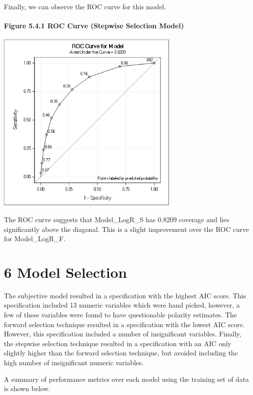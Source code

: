 \documentclass[]{article}
\let\oldparagraph\paragraph
\renewcommand{\paragraph}[1]{\oldparagraph{#1}\mbox{}}
\begin{document}
Finally, we can observe the ROC curve for this model.

\paragraph{Figure 5.4.1 ROC Curve (Stepwise Selection
Model)}\label{figure-5.4.1-roc-curve-stepwise-selection-model}

\includegraphics[height=3.54167in]{images/roc_s.png}

The ROC curve suggests that Model\_LogR\_S has 0.8209 coverage and lies
significantly above the diagonal. This is a slight improvement over the
ROC curve for Model\_LogR\_F.

\section{6 Model Selection}\label{model-selection}

The subjective model resulted in a specification with the highest AIC
score. This specification included 13 numeric variables which were hand
picked, however, a few of these variables were found to have
questionable polarity estimates. The forward selection technique
resulted in a specification with the lowest AIC score. However, this
specification included a number of insignificant variables. Finally, the
stepwise selection technique resulted in a specification with an AIC
only slightly higher than the forward selection technique, but avoided
including the high number of insignificant numeric variables.

A summary of performance metrics over each model using the training set
of data is shown below.
\end{document}

